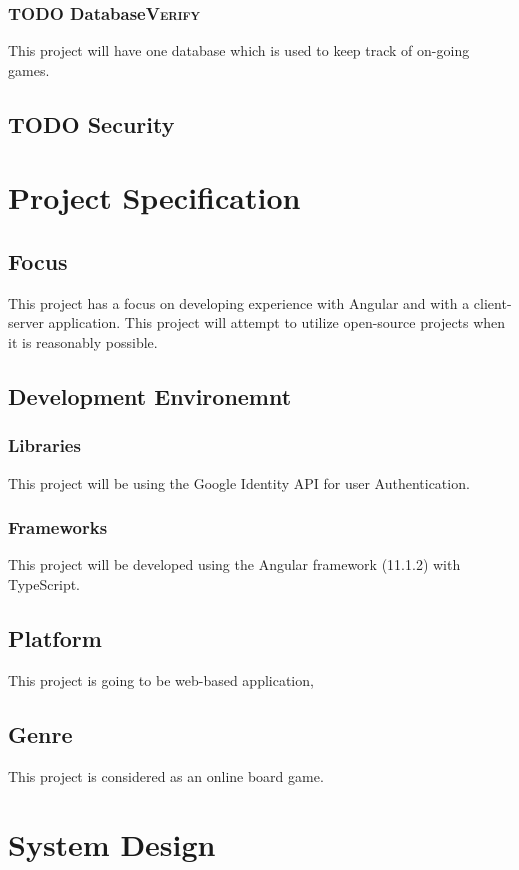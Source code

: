 \documentclass[11pt]{article}
\begin{document}
\subsubsection{{\bfseries\sffamily TODO} Database\hfill{}\textsc{Verify}}
\label{sec:orgcbf4328}
This project will have one database which is used to keep track of on-going games.
\subsection{{\bfseries\sffamily TODO} Security}
\label{sec:org82ea64f}

\section{Project Specification}
\label{sec:orgaa08407}
\subsection{Focus}
\label{sec:org00e3bce}
This project has a focus on developing experience with Angular and
with a client-server application. This project will attempt to utilize
open-source projects when it is reasonably possible.

\subsection{Development Environemnt}
\label{sec:org558edd4}
\subsubsection{Libraries}
\label{sec:orga693088}
This project will be using the Google Identity API for user Authentication.
\subsubsection{Frameworks}
\label{sec:org67f148d}
This project will be developed using the Angular framework (11.1.2)
with TypeScript.
\subsection{Platform}
\label{sec:org3feb2ce}
This project is going to be web-based application,
\subsection{Genre}
\label{sec:orge2a5561}
This project is considered as an online board game.
\section{System Design}
\label{sec:org8c257f6}
\end{document}
